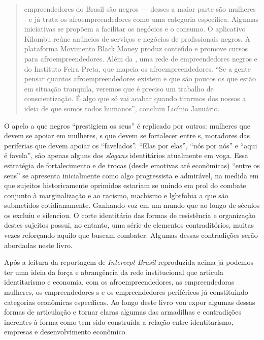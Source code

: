 \begin{quote}
empreendedores do Brasil são negros --- desses a maior parte são mulheres
- e já trata os afroempreendedores como uma categoria específica.
Algumas iniciativas se propõem a facilitar os negócios e o consumo. O
aplicativo Kilombu reúne anúncios de serviços e negócios de
profissionais negros. A plataforma Movimento Black Money produz conteúdo
e promove cursos para afroempreendedores. Além da , uma rede de
empreendedores negros e do Instituto Feira Preta, que mapeia os
afroempreendedores. ``Se a gente pensar quantos afroempreendedores
existem e que são poucos os que estão em situação tranquila, veremos que
é preciso um trabalho de conscientização. É algo que só vai acabar
quando tirarmos dos nossos a ideia de que somos todos humanos'',
concluiu Licínio Januário.
\end{quote}

O apelo a que negros ``prestigiem os seus'' é replicado por outros:
mulheres que devem se apoiar em mulheres, s que devem se fortalecer
entre s, moradores das periferias que devem apoiar os ``favelados''.
``Elas por elas'', ``nós por nós'' e ``aqui é favela'', são apenas
alguns dos \emph{slogans} identitários atualmente em voga. Essa
estratégia de fortalecimento e de trocas (desde emotivas até econômicas)
``entre os seus'' se apresenta inicialmente como algo progressista e
admirável, na medida em que sujeitos historicamente oprimidos estariam
se unindo em prol do combate conjunto à marginalização e ao racismo,
machismo e lgbtfobia a que são submetidos cotidianamente. Ganhando voz
em um mundo que ao longo de séculos os excluiu e silenciou. O corte
identitário das formas de resistência e organização destes sujeitos
possui, no entanto, uma série de elementos contraditórios, muitas vezes
reforçando aquilo que buscam combater. Algumas dessas contradições serão
abordadas neste livro.

Após a leitura da reportagem de \emph{Intercept Brasil} reproduzida
acima já podemos ter uma ideia da força e abrangência da rede
institucional que articula identitarismo e economia, com os
afroempreendedores, as empreendedoras mulheres, os empreendedores s
e os empreendedores periféricos já constituindo categorias econômicas
específicas. Ao longo deste livro vou expor algumas dessas formas de
articulação e tornar claras algumas das armadilhas e contradições
inerentes à forma como tem sido construída a relação entre
identitarismo, empresas e desenvolvimento econômico.

